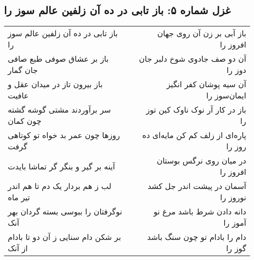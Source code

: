 \begin{center}
\section*{غزل شماره ۵: باز تابی در ده آن زلفین عالم سوز را}
\label{sec:005}
\begin{longtable}{l p{0.5cm} r}
باز تابی در ده آن زلفین عالم سوز را
&&
باز آبی بر زن آن روی جهان افروز را
\\
باز بر عشاق صوفی طبع صافی جان گمار
&&
آن دو صف جادوی شوخ دلبر جان دوز را
\\
باز بیرون تاز در میدان عقل و عافیت
&&
آن سیه پوشان کفر انگیز ایمان‌سوز را
\\
سر برآوردند مشتی گوشه گشته چون کمان
&&
باز در کار آر نوک ناوک کین توز را
\\
روزها چون عمر بد خواه تو کوتاهی گرفت
&&
پاره‌ای از زلف کم کن مایه‌ای ده روز را
\\
آینه بر گیر و بنگر گر تماشا بایدت
&&
در میان روی نرگس بوستان افروز را
\\
لب ز هم بردار یک دم تا هم اندر تیر ماه
&&
آسمان در پیشت اندر جل کشد نوروز را
\\
نوگرفتان را ببوسی بسته گردان بهر آنک
&&
دانه دادن شرط باشد مرغ نو آموز را
\\
بر شکن دام سنایی ز آن دو تا بادام از آنک
&&
دام را بادام تو چون سنگ باشد گوز را
\\
\end{longtable}
\end{center}
